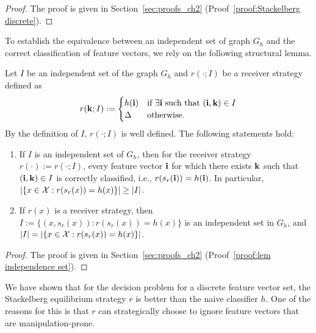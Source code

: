 \begin{proof} The proof is given in Section~\ref{sec:proofs_ch2} (Proof~\ref{proof:Stackelberg discrete}).
\end{proof}

To establish the equivalence between an independent set of graph $G_h$ and the correct classification of feature vectors, we rely on the following structural lemma.

\begin{lem}\label{lem:1-1 correspondance between independence set and recoverable feature vector}
	Let $I$ be an independent set of the graph $G_h$ and $r(\cdot;I)$ be a receiver strategy defined as
	\begin{equation*}
		r(\mathbf{k};I) := \begin{cases}
			h(\mathbf{i}) & \text{if } \exists \mathbf{i} \text{ such that } (\mathbf{i},\mathbf{k}) \in I\\
			\Delta & \text{otherwise}.
		\end{cases}
	\end{equation*}
    By the definition of $I$, $r(\cdot;I)$ is well defined. The following statements hold:
	\begin{enumerate}[label=(\alph*)]
		\item If $I$ is an independent set of $G_h$, then for the receiver strategy $r(\cdot) := r(\cdot;I)$, every feature vector $\mathbf{i}$ for which there exists $\mathbf{k}$ such that $(\mathbf{i},\mathbf{k}) \in I$ is correctly classified, i.e., $r(s_r(\mathbf{i})) = h(\mathbf{i})$. In particular, $|\{x \in \mathcal{X}: r(s_r(x)) = h(x)\}| \geq |I|$.
		\item If $r(x)$ is a receiver strategy, then $I := \{(x,s_r(x)): r(s_r(x)) = h(x)\}$ is an independent set in $G_h$, and $|I| = |\{x \in \mathcal{X}: r(s_r(x)) = h(x)\}|$. 
	\end{enumerate}
\end{lem}

\begin{proof} The proof is given in Section~\ref{sec:proofs_ch2} (Proof~\ref{proof:lem independence set}).
\end{proof}

We have shown that for the decision problem for a discrete feature vector set, the Stackelberg equilibrium strategy $r$ is better than the naive classifier $h$. One of the reasons for this is that $r$ can strategically choose to ignore feature vectors that are manipulation-prone.
